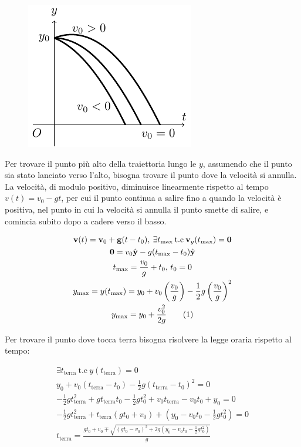 \documentclass{article}
\newcommand{\vect}[1]{\boldsymbol{\mathbf{#1}}}
\numberwithin{equation}{subsection}
\begin{document}
\begin{figure}[H]%
    \centering
    \includegraphics{caduta.pdf}%
\end{figure}

Per trovare il punto più alto della traiettoria lungo le $y$,
assumendo che il punto sia stato lanciato verso l'alto, bisogna
trovare il punto dove la velocità si annulla. La velocità, di modulo positivo, diminuisce linearmente rispetto al tempo $v(t)=v_0-gt$, per cui il punto 
continua a salire fino a quando la velocità è positiva, nel punto in cui la velocità si annulla il punto smette di salire, e comincia subito dopo a 
cadere verso il basso. 

\begin{gather*}
    \vect{v}(t) = \vect{v}_0  + \vect{g}(t-t_0),\:\exists t_{\max} \:\mbox{t.c}\:\vect{v}_y(t_{\max}) = \vect{0}\\
    \vect0= v_0\hat{\vect{y}} - g(t_{\max}-t_0)\hat{\vect{y}}\\
    t_{\max} = \displaystyle\frac{v_0}{g} + t_0,\,t_0=0\\
    y_{\max} = y(t_{\max}) = y_0 + v_0\left(\displaystyle\frac{v_0}{g}\right) -\displaystyle\frac{1}{2}g\left(\displaystyle\frac{v_0}{g}\right)^{2}\\
    y_{\max}=y_0 + \displaystyle\frac{v_0^{2}}{2g}\tag{\stepcounter{equation}\theequation}
\end{gather*}

Per trovare il punto dove tocca terra bisogna risolvere 
la legge oraria rispetto al tempo:

\begin{gather*}
    \exists t_\mathrm{terra}\:\mbox{t.c}\: y(t_\mathrm{terra}) = 0\\
    y_0 + v_0(t_\mathrm{terra} - t_0)-\displaystyle\frac{1}{2}g
    (t_\mathrm{terra} - t_0)^{2} = 0\\
    -\displaystyle\frac{1}{2}gt_\mathrm{terra}^{2} + gt_\mathrm{terra}t_0
    -\displaystyle\frac{1}{2}gt_0^{2}+v_0t_\mathrm{terra} - v_0t_0 +y_0 =0\\
    -\displaystyle\frac{1}{2}gt_\mathrm{terra}^{2}+t_\mathrm{terra}
    (gt_0+v_0) + \left(y_0-v_0t_0 
    -\displaystyle\frac{1}{2}gt_0^{2}\right)=0\\
    t_\mathrm{terra} = \displaystyle\frac{gt_0+v_0 \mp\sqrt{(gt_0-v_0)^{2}+2g\left(y_0-v_0t_0-\displaystyle\frac{1}{2}gt_0^{2}\right)}}{g}
\end{gather*}
\end{document}
